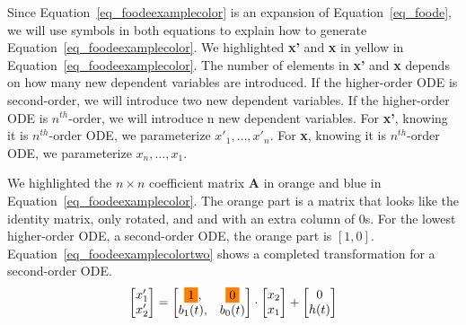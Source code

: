 Since Equation~\ref{eq_foodeexamplecolor} is an expansion of Equation~\ref{eq_foode}, we will use symbols in both equations to explain how to generate Equation~\ref{eq_foodeexamplecolor}. We highlighted \textbf{x'} and \textbf{x} in yellow in Equation~\ref{eq_foodeexamplecolor}. The number of elements in \textbf{x'} and \textbf{x} depends on how many new dependent variables are introduced. If the higher-order ODE is second-order, we will introduce two new dependent variables. If the higher-order ODE is $n^{th}$-order, we will introduce n new dependent variables. For \textbf{x'}, knowing it is $n^{th}$-order ODE, we parameterize $x'_{1}, \dots, x'_{n}$. For \textbf{x}, knowing it is $n^{th}$-order ODE, we parameterize $x_{n}, \dots, x_{1}$.

We highlighted the $n \times n$ coefficient matrix \textbf{A} in orange and blue in Equation~\ref{eq_foodeexamplecolor}. The orange part is a matrix that looks like the identity matrix, only rotated, and and with an extra column of 0s. For the lowest higher-order ODE, a second-order ODE, the orange part is $[1, 0]$. Equation~\ref{eq_foodeexamplecolortwo} shows a completed transformation for a second-order ODE.
\begin{equation} \label{eq_foodeexamplecolortwo}
	\begin{bmatrix}
		{x_{1}'} \\
    {x_{2}'} 
	\end{bmatrix}
    = 
  \begin{bmatrix}
		\highlight{orange}{1}, & \highlight{orange}{0} \\
    {b_{1}(t)}, & {b_{0}(t)}
	\end{bmatrix}
    \cdot
  \begin{bmatrix}
		{x_{2}} \\
    {x_{1}} 
	\end{bmatrix}
    + 
  \begin{bmatrix}
    {0} \\
    {h(t)}
	\end{bmatrix}
\end{equation}


